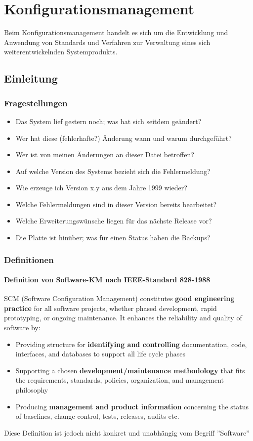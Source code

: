 \section{Konfigurationsmanagement}
Beim Konfigurationsmanagement handelt es sich um die Entwicklung und Anwendung von Standards und Verfahren zur Verwaltung eines sich weiterentwickelnden Systemprodukts.
\subsection{Einleitung}
\subsubsection{Fragestellungen}
\begin{itemize}
	\item Das System lief gestern noch; was hat sich seitdem geändert?
	\item Wer hat diese (fehlerhafte?) Änderung wann und warum durchgeführt?
	\item Wer ist von meinen Änderungen an dieser Datei betroffen?
	\item Auf welche Version des Systems bezieht sich die Fehlermeldung?
	\item Wie erzeuge ich Version x.y aus dem Jahre 1999 wieder?
	\item Welche Fehlermeldungen sind in dieser Version bereits bearbeitet?
	\item Welche Erweiterungswünsche liegen für das nächste Release vor?
	\item  Die Platte ist hinüber; was für einen Status haben die Backups?
\end{itemize}
\subsubsection{Definitionen}
\paragraph{Definition von Software-KM nach IEEE-Standard 828-1988}
SCM (Software Configuration Management) constitutes \textbf{good engineering practice } for all software projects, whether phased development, rapid prototyping, or ongoing  maintenance. It enhances the reliability and quality of software by:
\begin{itemize}
	\item Providing structure for \textbf{identifying and controlling} documentation, code, interfaces, and databases to support all life cycle phases
	\item Supporting a chosen \textbf{development/maintenance methodology} that fits the requirements, standards, policies, organization, and management philosophy
	\item Producing \textbf{management and product information} concerning the status of baselines, change control, tests, releases, audits etc.
\end{itemize}
Diese Definition ist jedoch nicht konkret und unabhängig vom Begriff ''Software''
